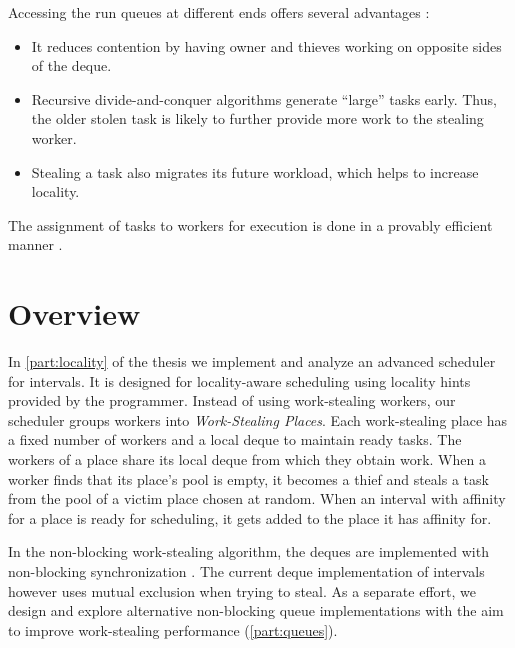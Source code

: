 Accessing the run queues at different ends offers several advantages
\cite{Frigo1998}:

\begin{itemize}
\item It reduces contention by having owner and thieves working on
  opposite sides of the deque.
\item Recursive divide-and-conquer algorithms generate ``large'' tasks
  early. Thus, the older stolen task is likely to further provide more
  work to the stealing worker.
\item Stealing a task also migrates its future workload, which helps
  to increase locality.
\end{itemize}

The assignment of tasks to workers for execution is done in a provably
efficient manner \cite{Blumofe1995, Blumofe1999}.


\section{Overview}
\label{sec:intro-overview}

In \autoref{part:locality} of the thesis we implement and analyze an
advanced scheduler for intervals. It is designed for locality-aware
scheduling using locality hints provided by the programmer. Instead of
using work-stealing workers, our scheduler groups workers into
\emph{Work-Stealing Places}.  Each work-stealing place has a fixed
number of workers and a local deque to maintain ready tasks. The
workers of a place share its local deque from which they obtain
work. When a worker finds that its place's pool is empty, it becomes a
thief and steals a task from the pool of a victim place chosen at
random. When an interval with affinity for a place is ready for
scheduling, it gets added to the place it has affinity for.

In the non-blocking work-stealing algorithm, the deques are
implemented with non-blocking synchronization \cite{Arora2001}. The
current deque implementation of intervals however uses mutual
exclusion when trying to steal. As a separate effort, we design and
explore alternative non-blocking queue implementations with the aim to
improve work-stealing performance (\autoref{part:queues}).


